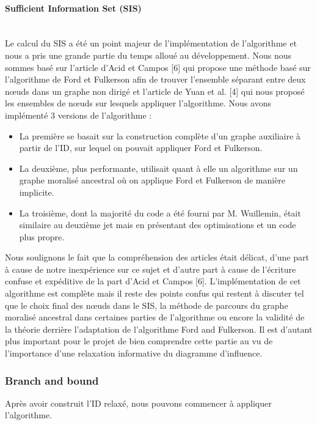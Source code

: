 \documentclass[12pt]{article}
\newcommand{\subsubsubsection}[1]{\paragraph{#1}\mbox{}\\}
\begin{document}
\subsubsubsection{Sufficient Information Set (SIS)}
Le calcul du SIS a été un point majeur de l'implémentation de l'algorithme et nous a pris une grande partie du temps alloué au développement.
\bigbreak
Nous nous sommes basé sur l'article d'Acid et Campos [6] qui propose une méthode basé sur l'algorithme de Ford et Fulkerson afin de trouver l'ensemble séparant entre deux nœuds dans un graphe non dirigé et l'article de Yuan et al. [4] qui nous proposé les ensembles de nœuds sur lesquels appliquer l'algorithme.
\bigbreak
Nous avons implémenté 3 versions de l'algorithme :
\begin{itemize}
    \item La première se basait sur la construction complète d'un graphe auxiliaire à partir de l'ID, sur lequel on pouvait appliquer Ford et Fulkerson.
    \item La deuxième, plus performante, utilisait quant à elle un algorithme sur un graphe moralisé ancestral où on applique Ford et Fulkerson de manière implicite.
    \item La troisième, dont la majorité du code a été fourni par M. Wuillemin, était similaire au deuxième jet mais en présentant des optimisations et un code plus propre.
\end{itemize}
Nous soulignons le fait que la compréhension des articles était délicat, d'une part à cause de notre inexpérience sur ce sujet et d'autre part à cause de l'écriture confuse et expéditive de la part d'Acid et Campos [6]. L'implémentation de cet algorithme est complète mais il reste des points confus qui restent à discuter tel que le choix final des nœuds dans le SIS, la méthode de parcours du graphe moralisé ancestral dans certaines parties de l'algorithme ou encore la validité de la théorie derrière l'adaptation de l'algorithme Ford and Fulkerson. Il est d'autant plus important pour le projet de bien comprendre cette partie au vu de l'importance d'une relaxation informative du diagramme d'influence.

\subsubsection{Branch and bound}
Après avoir construit l'ID relaxé, nous pouvons commencer à appliquer l'algorithme. 
\end{document}
